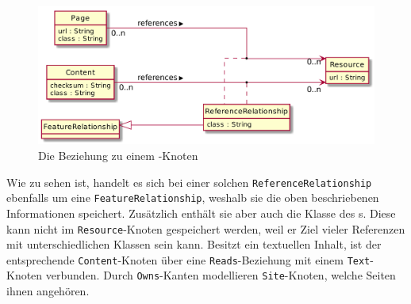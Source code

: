     \begin{figure}
        \centering
        \includegraphics[scale=\imageScalingFactor]{../resources/db-data-model/resource-relationship.png}
        \caption{Die Beziehung zu einem {\resource}-Knoten}
        \label{image:dbDataModelResourceRelationship}
    \end{figure}

    Wie zu sehen ist, handelt es sich bei einer solchen \texttt{ReferenceRelationship} ebenfalls
    um eine \texttt{FeatureRelationship}, weshalb sie die oben beschriebenen Informationen speichert.
    Zusätzlich enthält sie aber auch die Klasse des {}s.
    Diese kann nicht im \texttt{Resource}-Knoten gespeichert werden,
    weil er Ziel vieler Referenzen mit unterschiedlichen Klassen sein kann.
    Besitzt ein {\contentFeature} textuellen Inhalt,
    ist der entsprechende \texttt{Content}-Knoten über eine \texttt{Reads}-Beziehung
    mit einem \texttt{Text}-Knoten verbunden.
    Durch \texttt{Owns}-Kanten modellieren \texttt{Site}-Knoten,
    welche Seiten ihnen angehören.
